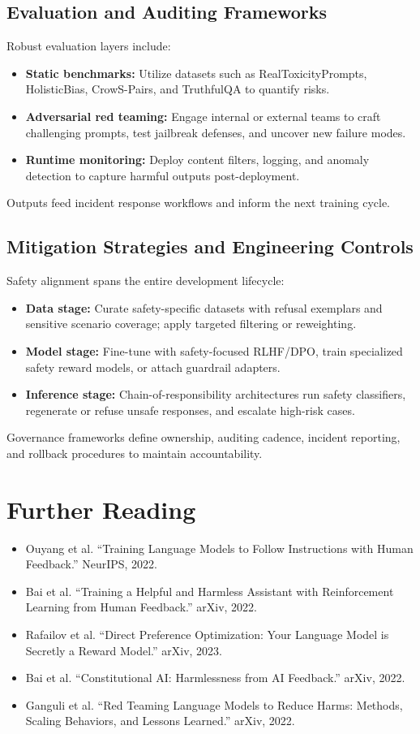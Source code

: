 \documentclass{article}
\begin{document}
\subsection{Evaluation and Auditing Frameworks}
Robust evaluation layers include:
\begin{itemize}
  \item \textbf{Static benchmarks:} Utilize datasets such as RealToxicityPrompts, HolisticBias, CrowS-Pairs, and TruthfulQA to quantify risks.
  \item \textbf{Adversarial red teaming:} Engage internal or external teams to craft challenging prompts, test jailbreak defenses, and uncover new failure modes.
  \item \textbf{Runtime monitoring:} Deploy content filters, logging, and anomaly detection to capture harmful outputs post-deployment.
\end{itemize}
Outputs feed incident response workflows and inform the next training cycle.

\subsection{Mitigation Strategies and Engineering Controls}
Safety alignment spans the entire development lifecycle:
\begin{itemize}
  \item \textbf{Data stage:} Curate safety-specific datasets with refusal exemplars and sensitive scenario coverage; apply targeted filtering or reweighting.
  \item \textbf{Model stage:} Fine-tune with safety-focused RLHF/DPO, train specialized safety reward models, or attach guardrail adapters.
  \item \textbf{Inference stage:} Chain-of-responsibility architectures run safety classifiers, regenerate or refuse unsafe responses, and escalate high-risk cases.
\end{itemize}
Governance frameworks define ownership, auditing cadence, incident reporting, and rollback procedures to maintain accountability.

\section*{Further Reading}
\begin{itemize}
  \item Ouyang et al. ``Training Language Models to Follow Instructions with Human Feedback.'' NeurIPS, 2022.
  \item Bai et al. ``Training a Helpful and Harmless Assistant with Reinforcement Learning from Human Feedback.'' arXiv, 2022.
  \item Rafailov et al. ``Direct Preference Optimization: Your Language Model is Secretly a Reward Model.'' arXiv, 2023.
  \item Bai et al. ``Constitutional AI: Harmlessness from AI Feedback.'' arXiv, 2022.
  \item Ganguli et al. ``Red Teaming Language Models to Reduce Harms: Methods, Scaling Behaviors, and Lessons Learned.'' arXiv, 2022.
\end{itemize}
\end{document}
